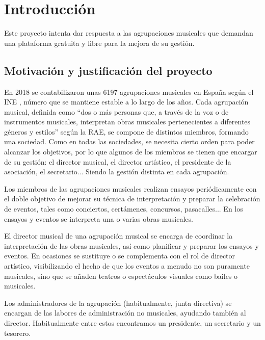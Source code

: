 \chapter{Introducción}

Este proyecto intenta dar respuesta a las agrupaciones musicales que demandan una plataforma gratuita y libre para la mejora de su gestión.

\section{Motivación y justificación del proyecto}


En 2018 se contabilizaron unas 6197 agrupaciones musicales en España según el INE \cite{ineNumeroAgrupaciones}, número que se mantiene estable a lo largo de los años. Cada agrupación musical, definida como ``dos o más personas que, a través de la voz o de instrumentos musicales, interpretan obras musicales pertenecientes a diferentes géneros y estilos'' según la RAE, se compone de distintos miembros, formando una sociedad. Como en todas las sociedades, se necesita cierto orden para poder alcanzar los objetivos, por lo que algunos de los miembros se tienen que encargar de su gestión: el director musical, el director artístico, el presidente de la asociación, el secretario... Siendo la gestión distinta en cada agrupación.

Los miembros de las agrupaciones musicales realizan ensayos periódicamente con el doble objetivo de mejorar su técnica de interpretación y preparar la celebración de eventos, tales como conciertos, certámenes, concursos, pasacalles... En los ensayos y eventos se interpreta una o varias obras musicales.

El director musical de una agrupación musical se encarga de coordinar la interpretación de las obras musicales, así como planificar y preparar los ensayos y eventos. En ocasiones se sustituye o se complementa con el rol de director artístico, visibilizando el hecho de que los eventos a menudo no son puramente musicales, sino que se añaden teatros o espectáculos visuales como bailes o musicales.

Los administradores de la agrupación (habitualmente, junta directiva) se encargan de las labores de administración no musicales, ayudando también al director. Habitualmente entre estos encontramos un presidente, un secretario y un tesorero.

